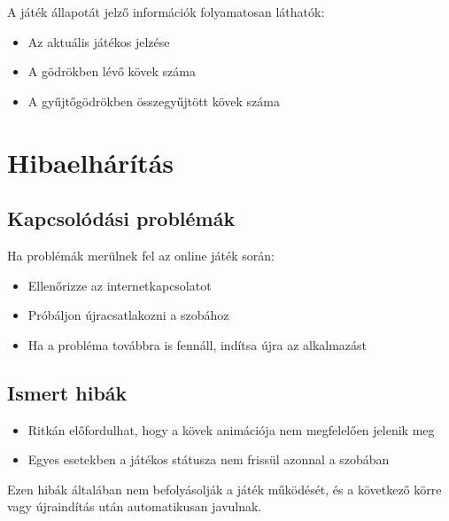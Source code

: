 A játék állapotát jelző információk folyamatosan láthatók:
\begin{itemize}
	\item Az aktuális játékos jelzése
	\item A gödrökben lévő kövek száma
	\item A gyűjtőgödrökben összegyűjtött kövek száma
\end{itemize}

\section{Hibaelhárítás}

\subsection{Kapcsolódási problémák}
Ha problémák merülnek fel az online játék során:
\begin{itemize}
	\item Ellenőrizze az internetkapcsolatot
	\item Próbáljon újracsatlakozni a szobához
	\item Ha a probléma továbbra is fennáll, indítsa újra az alkalmazást
\end{itemize}

\subsection{Ismert hibák}
\begin{itemize}
	\item Ritkán előfordulhat, hogy a kövek animációja nem megfelelően jelenik meg
	\item Egyes esetekben a játékos státusza nem frissül azonnal a szobában
\end{itemize}

Ezen hibák általában nem befolyásolják a játék működését, és a következő körre vagy újraindítás után automatikusan javulnak.